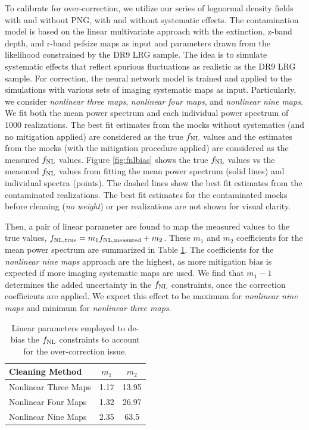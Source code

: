 To calibrate for over-correction, we utilize our series of lognormal density fields with and without PNG, with and without systematic effects. The contamination model is based on the linear multivariate approach with the extinction, z-band depth, and r-band psfsize maps as input and parameters drawn from the likelihood constrained by the DR9 LRG sample. The idea is to simulate systematic effects that reflect spurious fluctuations as  realistic as the DR9 LRG sample. For correction, the neural network model is trained and applied to the simulations with various sets of imaging systematic maps as input. Particularly, we consider \textit{nonlinear three maps}, \textit{nonlinear four maps}, and \textit{nonlinear nine maps}. We fit both the mean power spectrum and each individual power spectrum of 1000 realizations. The best fit estimates from the mocks without systematics (and no mitigation applied) are considered as the true $f_{\rm NL}$ values and the estimates from the mocks (with the mitigation procedure applied) are considered as the measured $f_{\rm NL}$ values. Figure \ref{fig:fnlbias} shows the true $f_{\rm NL}$ values vs the measured $f_{\rm NL}$ values from fitting the mean power spectrum (solid lines) and individual spectra (points). The dashed lines show the best fit estimates from the contaminated realizations. The best fit estimates for the contaminated mocks before cleaning (\textit{no weight}) or per realizations are not shown for visual clarity. 

Then, a pair of linear parameter are found to map the measured values to the true values, $f_{\rm NL, true} = m_{1} f_{\rm NL, measured} + m_{2}$. These $m_{1}$ and $m_{2}$ coefficients for the mean power spectrum are summarized in Table \ref{tab:debiasparams}. The coefficients for the \textit{nonlinear nine maps} approach are the highest, as more mitigation bias is expected if more imaging systematic maps are used. We find that $m_{1}-1$ determines the added uncertainty in the $f_{\rm NL}$ constraints, once the correction coefficients are applied. We expect this effect to be maximum for \textit{nonlinear nine maps} and minimum for \textit{nonlinear three maps}.

\begin{table}
\begin{center}
\caption{Linear parameters employed to de-bias the $f_{\rm NL}$ constraints to account for the over-correction issue.}\label{tab:debiasparams}
\begin{tabular}{lcc}
\hline
\hline
\textbf{Cleaning Method} & $m_{1}$ & $m_{2}$ \\
\hline
Nonlinear Three Maps & 1.17 & 13.95 \\
Nonlinear Four Maps & 1.32 & 26.97 \\
Nonlinear Nine Maps & 2.35 & 63.5\\
\hline
\end{tabular}
\end{center}
\end{table}